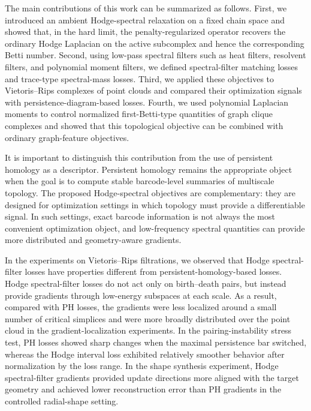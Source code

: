 \documentclass[pdflatex,sn-mathphys-ay]{sn-jnl}%
\theoremstyle{thmstyleone}%
\theoremstyle{thmstyletwo}%
\theoremstyle{thmstylethree}%
\begin{document}
The main contributions of this work can be summarized as follows. First, we introduced an ambient Hodge-spectral relaxation on a fixed chain space and showed that, in the hard limit, the penalty-regularized operator recovers the ordinary Hodge Laplacian on the active subcomplex and hence the corresponding Betti number. Second, using low-pass spectral filters such as heat filters, resolvent filters, and polynomial moment filters, we defined spectral-filter matching losses and trace-type spectral-mass losses. Third, we applied these objectives to Vietoris--Rips complexes of point clouds and compared their optimization signals with persistence-diagram-based losses. Fourth, we used polynomial Laplacian moments to control normalized first-Betti-type quantities of graph clique complexes and showed that this topological objective can be combined with ordinary graph-feature objectives.

It is important to distinguish this contribution from the use of persistent homology as a descriptor. Persistent homology remains the appropriate object when the goal is to compute stable barcode-level summaries of multiscale topology. The proposed Hodge-spectral objectives are complementary: they are designed for optimization settings in which topology must provide a differentiable signal. In such settings, exact barcode information is not always the most convenient optimization object, and low-frequency spectral quantities can provide more distributed and geometry-aware gradients.

In the experiments on Vietoris--Rips filtrations, we observed that Hodge spectral-filter losses have properties different from persistent-homology-based losses. Hodge spectral-filter losses do not act only on birth--death pairs, but instead provide gradients through low-energy subspaces at each scale. As a result, compared with PH losses, the gradients were less localized around a small number of critical simplices and were more broadly distributed over the point cloud in the gradient-localization experiments. In the pairing-instability stress test, PH losses showed sharp changes when the maximal persistence bar switched, whereas the Hodge interval loss exhibited relatively smoother behavior after normalization by the loss range. In the shape synthesis experiment, Hodge spectral-filter gradients provided update directions more aligned with the target geometry and achieved lower reconstruction error than PH gradients in the controlled radial-shape setting.
\end{document}
